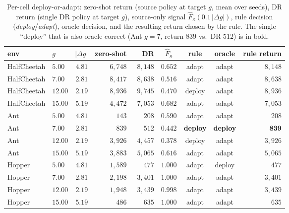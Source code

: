 \documentclass{article}
\begin{document}
\begin{table}[h]
\centering\small
\caption{Per-cell deploy-or-adapt: zero-shot return (source policy at target $g$, mean over seeds), DR return (single DR policy at target $g$), source-only signal $\hat F_\kappa(0.1\,|\Delta g|)$, rule decision (\emph{deploy}/\emph{adapt}), oracle decision, and the resulting return chosen by the rule. The single ``deploy'' that is also oracle-correct (Ant $g{=}7$, return $839$ vs.\ DR $512$) is in bold.}
\label{tab:deploy-or-adapt-cells}
\begin{tabular}{llrrrcccr}
\toprule
env & $g$ & $|\Delta g|$ & zero-shot & DR & $\hat F_\kappa$ & rule & oracle & rule return \\
\midrule
HalfCheetah & $5.00$  & $4.81$ & $6{,}748$ & $8{,}148$ & $0.652$ & adapt  & adapt  & $8{,}148$ \\
HalfCheetah & $7.00$  & $2.81$ & $8{,}417$ & $8{,}638$ & $0.516$ & adapt  & adapt  & $8{,}638$ \\
HalfCheetah & $12.00$ & $2.19$ & $8{,}936$ & $9{,}745$ & $0.470$ & deploy & adapt  & $8{,}936$ \\
HalfCheetah & $15.00$ & $5.19$ & $4{,}472$ & $7{,}053$ & $0.682$ & adapt  & adapt  & $7{,}053$ \\
\midrule
Ant & $5.00$  & $4.81$ & $\phantom{0,0}143$ & $\phantom{0,0}208$ & $0.590$ & adapt  & adapt  & $208$ \\
Ant & $7.00$  & $2.81$ & $\phantom{0,0}839$ & $\phantom{0,0}512$ & $0.442$ & \textbf{deploy} & \textbf{deploy} & $\mathbf{839}$ \\
Ant & $12.00$ & $2.19$ & $3{,}926$ & $4{,}457$ & $0.378$ & deploy & adapt  & $3{,}926$ \\
Ant & $15.00$ & $5.19$ & $3{,}883$ & $5{,}065$ & $0.616$ & adapt  & adapt  & $5{,}065$ \\
\midrule
Hopper & $5.00$  & $4.81$ & $1{,}589$ & $\phantom{0,0}477$ & $1.000$ & adapt  & deploy & $477$ \\
Hopper & $7.00$  & $2.81$ & $2{,}198$ & $3{,}401$ & $1.000$ & adapt  & adapt  & $3{,}401$ \\
Hopper & $12.00$ & $2.19$ & $1{,}948$ & $3{,}439$ & $0.998$ & adapt  & adapt  & $3{,}439$ \\
Hopper & $15.00$ & $5.19$ & $\phantom{0,}486$ & $\phantom{0,0}635$ & $1.000$ & adapt  & adapt  & $635$ \\
\bottomrule
\end{tabular}
\end{table}
\end{document}
